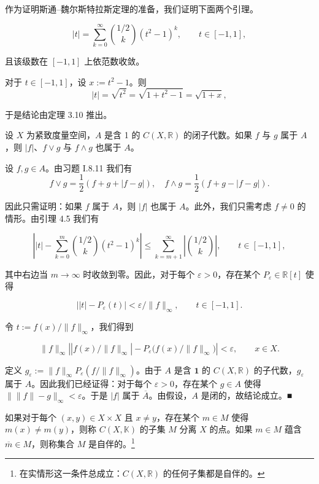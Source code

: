 作为证明斯通–魏尔斯特拉斯定理的准备，我们证明下面两个引理。

\begin{lemma}
\[
|t|=\sum_{k=0}^{\infty}\binom{1/2}{k}(t^{2}-1)^{k},\qquad t\in[-1,1],
\]

且该级数在  $ [-1,1] $ 上依范数收敛。

\proofhead
对于  $ t \in [-1,1] $，设  $ x := t^2 - 1 $。则
\[
\left|t\right|=\sqrt{t^{2}}=\sqrt{1+t^{2}-1}=\sqrt{1+x},
\]

于是结论由定理 3.10 推出。

\end{lemma}

\begin{lemma}

设 $X$ 为紧致度量空间，$A$ 是含 1 的 $C(X, \mathbb{R})$ 的闭子代数。如果 $f$ 与 $g$ 属于 $A$，则 $|f|$、$f \vee g$ 与 $f \wedge g$ 也属于 $A$。

\proofhead
设  $ f, g \in A $。由习题 I.8.11 我们有
\[
f\vee g=\frac{1}{2}(f+g+|f-g|),\quad f\wedge g=\frac{1}{2}(f+g-|f-g|).
\]

因此只需证明：如果 $f$ 属于 $A$，则 $|f|$ 也属于 $A$。此外，我们只需考虑 $f \neq 0$ 的情形。由引理 4.5 我们有

\[
\left||t|-\sum_{k=0}^{m}\binom{1/2}{k}(t^{2}-1)^{k}\right|\leq\sum_{k=m+1}^{\infty}\left|\binom{1/2}{k}\right|,\qquad t\in[-1,1],
\]

其中右边当  $ m \to \infty $ 时收敛到零。因此，对于每个  $ \varepsilon > 0 $，存在某个  $ P_\varepsilon \in \mathbb{R}[t] $ 使得

\[
\left|\left|t\right|-P_{\varepsilon}(t)\right|<\varepsilon/\|f\|_{\infty},\qquad t\in[-1,1].
\]

令  $ t := f(x)/\|f\|_\infty $，我们得到

\[
\|f\|_{\infty}\left|\left|f(x)/\|f\|_{\infty}\right|-P_{\varepsilon}\bigl(f(x)/\|f\|_{\infty}\bigr)\right|<\varepsilon,\qquad x\in X.
\]

定义 $g_\varepsilon := \| f \|_\infty P_\varepsilon(f/\| f\|_\infty)$。由于 $A$ 是含 $\mathbf{1}$ 的 $C(X, \mathbb{R})$ 的子代数，$g_\varepsilon$ 属于 $A$。因此我们已经证得：对于每个 $\varepsilon > 0$，存在某个 $g \in A$ 使得 $\big\|\|f\|-g\big\|_\infty < \varepsilon$。于是 $|f|$ 属于 $\overline{A}$。由假设，$A$ 是闭的，故结论成立。■

\end{lemma}

如果对于每个 $(x, y) \in X \times X$ 且 $x \neq y$，存在某个 $m \in M$ 使得 $m(x) \neq m(y)$，则称 $C(X, \mathbb{K})$ 的子集 $M$ 分离 $X$ 的点。如果 $m \in M$ 蕴含 $\overline{m} \in M$，则称集合 $M$ 是自伴的。\footnote{在实情形这一条件总成立：$C(X, \mathbb{R})$ 的任何子集都是自伴的。}

